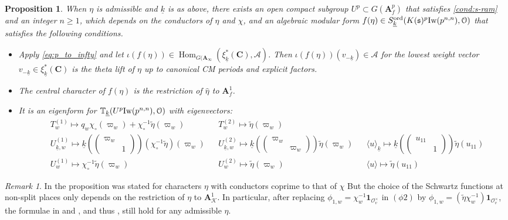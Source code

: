 \documentclass[leqno]{amsart}
\newtheorem{prop}[thm]{Proposition}
\theoremstyle{definition}
\theoremstyle{remark}
\newtheorem{rem}[thm]{Remark}
\newcommand{\smat}[1]{\left(\begin{smallmatrix} #1 \end{smallmatrix}\right)}
\newcommand{\id}{\mathbf{1}}
\newcommand{\oo}{\mathcal{O}}
\newcommand{\eo}{\EuScript{O}}
\newcommand{\C}{\mathbf C}
\newcommand{\A}{\mathbf A}
\DeclareMathOperator{\Hom}{Hom}
\newcommand{\fs}{\mathfrak{s}}
\newcommand{\K}{{\mathcal{K}}} %
\newcommand{\wt}[1]{\underline{ #1 }}
\newcommand{\Iw}{\textnormal{Iw}} %
\newcommand{\TT}{\mathbb{T}} %
\newcommand{\ord}{\textnormal{ord}} %
\begin{document}
\begin{prop}\cite[Prop. 7.5]{lee}\label{prop:single}
When $\eta$ is admissible and $\wt{k}$ is as above,
there exists an open compact subgroup $U^p\subset G(\A_f^p)$
that satisfies \eqref{cond:s-ram}
and an integer $n\geq 1$,
which depends on the conductors of $\eta$ and $\chi$,
and an algebraic modular form
$f(\eta)\in S_{\wt{k}}^{\ord}(K(\fs)^p\Iw(p^{n,n}),\eo)$
that satisfies the following conditions.
\begin{itemize}
\item 
Apply \eqref{eq:p_to_infty} and let $\iota(f(\eta))\in
\Hom_{G(\A_\infty}(\xi_{\wt{k}}^*(\C),\mathcal{A})$.
Then $\iota(f(\eta))(v_{-\wt{k}})\in\mathcal{A}$
for the lowest weight vector
$v_{-\wt{k}}\in \xi_{\wt{k}}^*(\C)$
is the theta lift of $\eta$
up to canonical CM periods and explicit factors.
\item The central character of $f(\eta)$
is the restriction of $\hat{\eta}$ to $\A_f^1$.
\item  It is an eigenform for 
$\TT_{\wt{k}}(U^p\Iw(p^{n,n}),\eo)$ with eigenvectors:
\begin{align*}
&T_w^{(1)}\mapsto
q_w\chi_\circ(\varpi_w)+\chi_\circ^{-1}\tilde{\eta}(\varpi_w)&
&T_w^{(2)}\mapsto \tilde{\eta}(\varpi_w)\\
&U_{\wt{k},w}^{(1)}\mapsto
\wt{k}(\smat{\varpi_w&\\&1})(\chi_\circ^{-1}\tilde{\eta})(\varpi_w)&
&U_{\wt{k},w}^{(2)}\mapsto
\wt{k}(\smat{\varpi_w&\\&\varpi_w})\tilde{\eta}(\varpi_w)&
&\langle u\rangle_{\wt{k}}\mapsto\wt{k}(\smat{u_{11}&\\&1})
\tilde{\eta}(u_{11})\\
&U_{w}^{(1)}\mapsto\chi_\circ^{-1}\tilde{\eta}(\varpi_w)&
&U_{w}^{(2)}\mapsto\tilde{\eta}(\varpi_w)&
&\langle u\rangle\mapsto \tilde{\eta}(u_{11})
\end{align*}
\end{itemize}

\end{prop}

\begin{rem}
In \cite{lee}
the proposition was stated 
for characters $\eta$
with conductors coprime to that of $\chi$
But the choice of the Schwartz functions
at non-split places only depends
on the restriction of $\eta$ to $\A_\K^1$.
In particular, after replacing 
$\phi_{1,w}=\chi_w^{-1}\id_{\oo_v^\times}$
in $(\phi 2)$ \cite[p.14]{lee}
by $\phi_{1,w}=(\tilde{\eta}\chi_w^{-1})\id_{\oo_v^\times}$,
the formulae in
\cite[Prop 4.3]{lee} and \cite[Prop 4.5]{lee},
and thus \cite[Prop 7.5]{lee}, 
still hold for any admissible $\eta$.
\end{rem}
\end{document}
